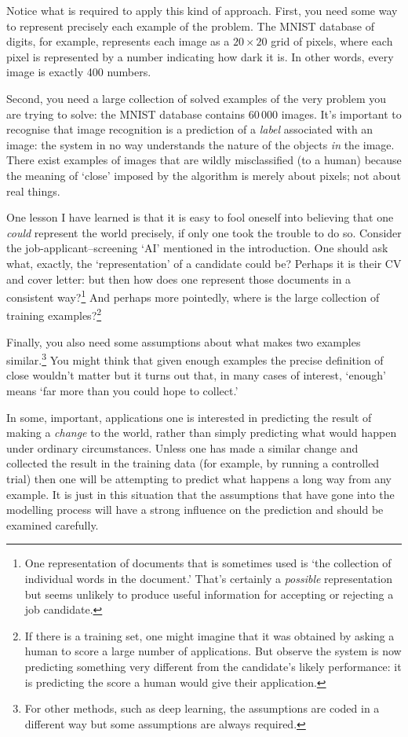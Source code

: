 \documentclass[10pt, a4paper, twocolumn]{article}
\begin{document}
Notice what is required to apply this kind of approach. First, you need some way
to represent precisely each example of the problem. The MNIST database of
digits, for example, represents each image as a $20\times 20$ grid of pixels, where
each pixel is represented by a number indicating how dark it is. In other words,
every image is exactly 400 numbers.

Second, you need a large collection of solved examples of the very problem you
are trying to solve: the MNIST database contains $60\,000$ images. It's important
to recognise that image recognition is a prediction of a \emph{label} associated
with an image: the system in no way understands the nature of the objects
\emph{in} the image. There exist examples of images that are wildly
misclassified (to a human) because the meaning of `close' imposed by the
algorithm is merely about pixels; not about real things.

One lesson I have learned is that it is easy to fool oneself into believing that
one \emph{could} represent the world precisely, if only one took the trouble to
do so. Consider the job-applicant--screening `AI' mentioned in the
introduction. One should ask what, exactly, the `representation' of a candidate
could be? Perhaps it is their CV and cover letter: but then how does one
represent those documents in a consistent way?\footnote{One representation of
documents that is sometimes used is `the collection of individual words in the
document.' That's certainly a \emph{possible} representation but seems unlikely
to produce useful information for accepting or rejecting a job candidate.} And
perhaps more pointedly, where is the large collection of training
examples?\footnote{If there is a training set, one might imagine that it was
obtained by asking a human to score a large number of applications. But observe
the system is now predicting something very different from the candidate's
likely performance: it is predicting the score a human would give their
application.}

Finally, you also need some assumptions about what makes two examples
similar.\footnote{For other methods, such as deep learning, the assumptions are
coded in a different way but some assumptions are always required.} You might
think that given enough examples the precise definition of close wouldn't matter
but it turns out that, in many cases of interest, `enough' means `far more than
you could hope to collect.'

In some, important, applications one is interested in predicting the result of
making a \emph{change} to the world, rather than simply predicting what would
happen under ordinary circumstances. Unless one has made a similar change and
collected the result in the training data (for example, by running a controlled
trial) then one will be attempting to predict what happens a long way from any
example. It is just in this situation that the assumptions that have gone into
the modelling process will have a strong influence on the prediction and should
be examined carefully.
\end{document}
